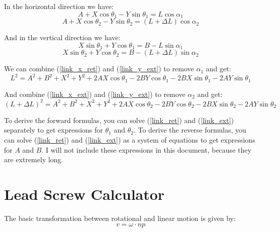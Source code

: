 \documentclass[11pt,a4paper,titlepage]{article}
\begin{document}
	In the horizontal direction we have:
	\begin{equation} \label{link_x_ret}
	A + X \cos \theta_1 - Y \sin \theta_1 = L \cos \alpha_1
	\end{equation}
	\begin{equation} \label{link_x_ext}
	A + X \cos \theta_2 - Y \sin \theta_2 = (L + \Delta L) \cos \alpha_2
	\end{equation}
	
	And in the vertical direction we have:
	\begin{equation} \label{link_y_ret}
	X \sin \theta_1 + Y \cos \theta_1 = B - L \sin \alpha_1
	\end{equation}
	\begin{equation} \label{link_y_ext}
	X \sin \theta_2 + Y \cos \theta_2 = B - (L + \Delta L) \sin \alpha_2
	\end{equation}
	
	We can combine (\ref{link_x_ret}) and (\ref{link_y_ext}) to remove $\alpha_1$ and get:
	\begin{equation} \label{link_ret}
	L^2 = A^2 + B^2 + X^2 + Y^2 + 2AX \cos \theta_1 - 2BY \cos \theta_1 - 2BX \sin \theta_1 - 2AY \sin \theta_1
	\end{equation}
	
	And combine (\ref{link_x_ext}) and (\ref{link_y_ext}) to remove $\alpha_2$ and get:
	\begin{equation} \label{link_ext}
	(L + \Delta L)^2 = A^2 + B^2 + X^2 + Y^2 + 2AX \cos \theta_2 - 2BY \cos \theta_2 - 2BX \sin \theta_2 - 2AY \sin \theta_2
	\end{equation}
	
	To derive the forward formulas, you can solve (\ref{link_ret}) and (\ref{link_ext}) separately to get expressions for $\theta_1$ and $\theta_2$. To derive the reverse formulas, you can solve (\ref{link_ret}) and (\ref{link_ext}) as a system of equations to get expressions for $A$ and $B$. I will not include these expressions in this document, because they are extremely long.
	
	
	\section{Lead Screw Calculator}
	
	The basic transformation between rotational and linear motion is given by:
	\begin{equation} \label{lead_screw_lin_rot}
	v = \omega \cdot n p
	\end{equation}
	
\end{document}
